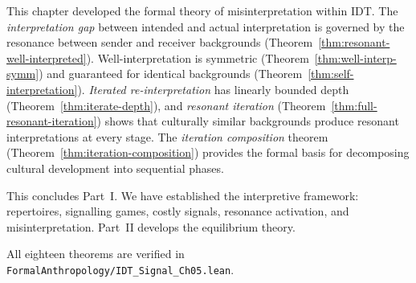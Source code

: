 This chapter developed the formal theory of misinterpretation within
IDT\@.  The \emph{interpretation gap} between intended and actual
interpretation is governed by the resonance between sender and receiver
backgrounds (Theorem~\ref{thm:resonant-well-interpreted}).
Well-interpretation is symmetric
(Theorem~\ref{thm:well-interp-symm}) and guaranteed for identical
backgrounds (Theorem~\ref{thm:self-interpretation}).  \emph{Iterated
re-interpretation} has linearly bounded depth
(Theorem~\ref{thm:iterate-depth}), and \emph{resonant iteration}
(Theorem~\ref{thm:full-resonant-iteration}) shows that culturally
similar backgrounds produce resonant interpretations at every stage.
The \emph{iteration composition} theorem
(Theorem~\ref{thm:iteration-composition}) provides the formal basis for
decomposing cultural development into sequential phases.

This concludes Part~I\@.  We have established the interpretive
framework: repertoires, signalling games, costly signals, resonance
activation, and misinterpretation.  Part~II develops the equilibrium
theory.

All eighteen theorems are verified in
\texttt{FormalAnthropology/IDT\_Signal\_Ch05.lean}.
